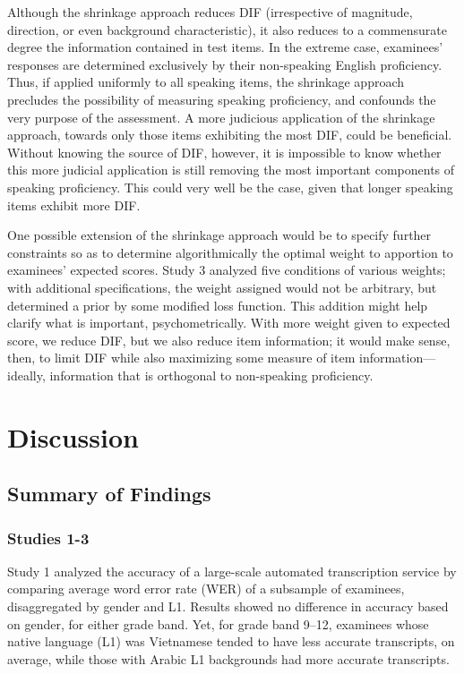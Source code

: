 \documentclass [PhD] {uclathes}
\begin{document}
Although the shrinkage approach reduces DIF (irrespective of magnitude, direction, or even background characteristic), it also reduces to a commensurate degree the information contained in test items. In the extreme case, examinees’ responses are determined exclusively by their non-speaking English proficiency. Thus, if applied uniformly to all speaking items, the shrinkage approach precludes the possibility of measuring speaking proficiency, and confounds the very purpose of the assessment. A more judicious application of the shrinkage approach, towards only those items exhibiting the most DIF, could be beneficial. Without knowing the source of DIF, however, it is impossible to know whether this more judicial application is still removing the most important components of speaking proficiency. This could very well be the case, given that longer speaking items exhibit more DIF. 

One possible extension of the shrinkage approach would be to specify further constraints so as to determine algorithmically the optimal weight to apportion to examinees’ expected scores. Study 3 analyzed five conditions of various weights; with additional specifications, the weight assigned would not be arbitrary, but determined a prior by some modified loss function. This addition might help clarify what is important, psychometrically. With more weight given to expected score, we reduce DIF, but we also reduce item information; it would make sense, then, to limit DIF while also maximizing some measure of item information—ideally, information that is orthogonal to non-speaking proficiency. 



\chapter{Discussion}

\section{Summary of Findings}

\subsection{Studies 1-3}

Study 1 analyzed the accuracy of a large-scale automated transcription service by comparing average word error rate (WER) of a subsample of examinees, disaggregated by gender and L1. Results showed no difference in accuracy based on gender, for either grade band. Yet, for grade band 9–12, examinees whose native language (L1) was Vietnamese tended to have less accurate transcripts, on average, while those with Arabic L1 backgrounds had more accurate transcripts. 
\end{document}
